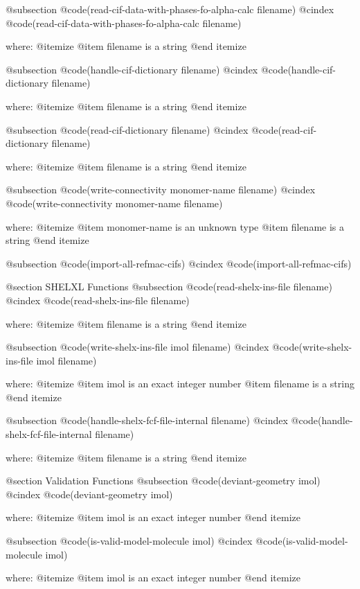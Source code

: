 @subsection @code{(read-cif-data-with-phases-fo-alpha-calc filename)}
@cindex @code{(read-cif-data-with-phases-fo-alpha-calc filename)}
 
where: 
 @itemize 
     @item filename is a string
 @end itemize


@subsection @code{(handle-cif-dictionary filename)}
@cindex @code{(handle-cif-dictionary filename)}
 
where: 
 @itemize 
     @item filename is a string
 @end itemize


@subsection @code{(read-cif-dictionary filename)}
@cindex @code{(read-cif-dictionary filename)}
 
where: 
 @itemize 
     @item filename is a string
 @end itemize


@subsection @code{(write-connectivity monomer-name filename)}
@cindex @code{(write-connectivity monomer-name filename)}
 
where: 
 @itemize 
     @item monomer-name is an unknown type
     @item filename is a string
 @end itemize


@subsection @code{(import-all-refmac-cifs)}
@cindex @code{(import-all-refmac-cifs)}
 

@section SHELXL Functions 
@subsection @code{(read-shelx-ins-file filename)}
@cindex @code{(read-shelx-ins-file filename)}
 
where: 
 @itemize 
     @item filename is a string
 @end itemize


@subsection @code{(write-shelx-ins-file imol filename)}
@cindex @code{(write-shelx-ins-file imol filename)}
 
where: 
 @itemize 
     @item imol is an exact integer number
     @item filename is a string
 @end itemize


@subsection @code{(handle-shelx-fcf-file-internal filename)}
@cindex @code{(handle-shelx-fcf-file-internal filename)}
 
where: 
 @itemize 
     @item filename is a string
 @end itemize



@section Validation Functions 
@subsection @code{(deviant-geometry imol)}
@cindex @code{(deviant-geometry imol)}
 
where: 
 @itemize 
     @item imol is an exact integer number
 @end itemize


@subsection @code{(is-valid-model-molecule imol)}
@cindex @code{(is-valid-model-molecule imol)}
 
where: 
 @itemize 
     @item imol is an exact integer number
 @end itemize


